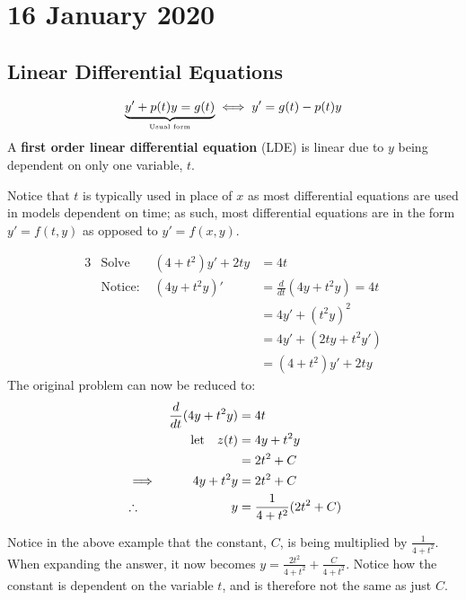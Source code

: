 \documentclass[diffeq.tex]{subfiles}
\begin{document}
\chapter{16 January 2020}
    \section{Linear Differential Equations}
    \begin{definition}
        \begin{equation}
            \underbrace{y' + p(t)y = g(t)}_\text{\tiny Usual form}\iff y' = g(t) - p(t)y
        \end{equation}
        A \textbf{first order linear differential equation} (LDE) is linear due to $y$ being dependent on only one variable, $t$.
    \end{definition}
    Notice that $t$ is typically used in place of $x$ as most differential equations are used in models dependent on time; as such, most differential equations are in the form $y' = f(t, y)$ as opposed to $y' = f(x, y)$.
    \begin{example}
        \begin{alignat}{3}
            &\text{Solve } &(4 + t^{2})y' + 2ty &= 4t\\
            &\text{Notice: }&(4y + t^{2}y)' &= \frac{d}{dt}(4y + t^{2}y) = 4t\\
            &&&= 4y' + (t^{2}y)^{2}\\
            &&&= 4y' + (2ty + t^{2}y')\\
            &&&= (4 + t^2)y' + 2ty
        \end{alignat}
        The original problem can now be reduced to:
        \begin{alignat}{3}
            &&\frac{d}{dt}(4y + t^2y)&= 4t\\
            &&\text{let\quad}z(t) &= 4y + t^{2}y\\
            &&&= 2 t^{2} + C\\
            &\implies& 4y + t^{2}y &= 2 t^{2}+C\\
            &\therefore& y &= \frac{1}{4+t^{2}}(2 t^{2}+C)
        \end{alignat}
    \end{example}
    \begin{remark}[Constants]
        Notice in the above example that the constant, $C$, is being multiplied by $\frac{1}{4 + t^{2}}$. When expanding the answer, it now becomes $y = \frac{2t^{2}}{4+t^{2}} + \frac{C}{4+t^{2}}$. Notice how the constant is dependent on the variable $t$, and is therefore not the same as just $C$.
    \end{remark}
\end{document}
